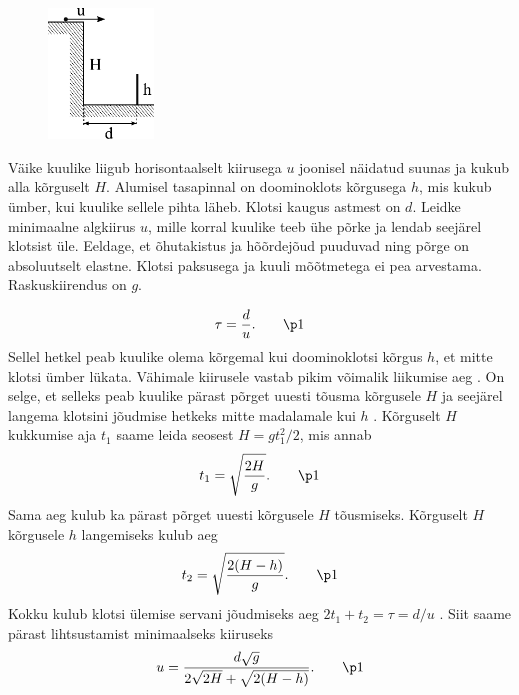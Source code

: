
\begin{figure}
  \vspace{-2em}
  \begin{center}
    \includegraphics[width=2.8cm]{2022-v2g-06-yl.pdf}
  \end{center}
  \vspace{-2em}
\end{figure}
Väike kuulike liigub horisontaalselt kiirusega $u$ joonisel näidatud suunas ja kukub alla kõrguselt $H$. Alumisel tasapinnal on doominoklots kõrgusega $h$, mis kukub ümber, kui kuulike sellele pihta läheb. Klotsi kaugus astmest on $d$. Leidke minimaalne algkiirus $u$, mille korral kuulike teeb ühe põrke ja lendab seejärel klotsist üle. Eeldage, et õhutakistus ja hõõrdejõud puuduvad ning põrge on absoluutselt elastne. Klotsi paksusega ja kuuli mõõtmetega ei pea arvestama. Raskuskiirendus on $g$.


\hint

\solu
\begin{equation*}
\tau=\frac{d}{u}. \qquad \p1
\end{equation*}
Sellel hetkel peab kuulike olema kõrgemal kui doominoklotsi kõrgus $h$, et mitte klotsi ümber lükata. Vähimale kiirusele vastab pikim võimalik liikumise aeg . On selge, et selleks peab kuulike pärast põrget uuesti tõusma kõrgusele $H$ ja seejärel langema klotsini jõudmise hetkeks mitte madalamale kui $h$ . Kõrguselt $H$ kukkumise aja $t_1$ saame leida seosest $H=gt_1^2/2$, mis annab
\begin{equation*}
t_1=\sqrt{\frac{2H}{g}}. \qquad \p1
\end{equation*}
Sama aeg kulub ka pärast põrget uuesti kõrgusele $H$ tõusmiseks. Kõrguselt $H$ kõrgusele $h$ langemiseks kulub aeg
\begin{equation*}
t_2=\sqrt{\frac{2(H-h)}{g}}. \qquad \p1
\end{equation*}
Kokku kulub klotsi ülemise servani jõudmiseks aeg $2t_1+t_2=\tau=d/u$ . Siit saame pärast lihtsustamist minimaalseks kiiruseks
\begin{equation*}
  u=\frac{d\sqrt{g}}{2\sqrt{2H}+\sqrt{2(H-h)}}. \qquad \p1
\end{equation*}
\probend